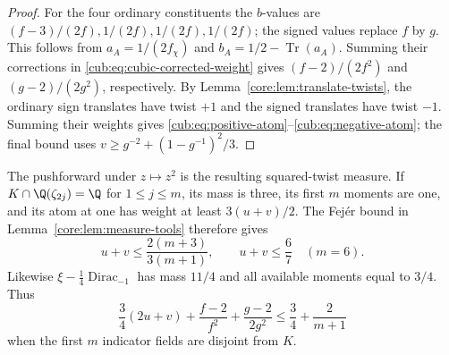 \begin{proof}
For the four ordinary constituents the $b$-values are
$(f-3)/(2f),1/(2f),1/(2f),1/(2f)$; the signed values replace $f$
by $g$. This follows from $a_A=1/(2f_\chi)$ and
$b_A=1/2-\operatorname{Tr}(a_A)$. Summing their corrections in
\eqref{cub:eq:cubic-corrected-weight} gives $(f-2)/(2f^2)$ and
$(g-2)/(2g^2)$, respectively. By
Lemma~\ref{core:lem:translate-twists}, the
ordinary sign translates have twist $+1$ and the signed translates
have twist $-1$. Summing their weights gives
\eqref{cub:eq:positive-atom}--\eqref{cub:eq:negative-atom}; the final
bound uses $v\ge g^{-2}+(1-g^{-1})^2/3$.
\end{proof}

The pushforward under $z\mapsto z^2$ is the resulting squared-twist
measure. If $K\cap\Q(\zeta_{2j})=\Q$ for $1\le j\le m$,
its mass is three, its first $m$ moments are one, and its atom at one
has weight at least $3(u+v)/2$. The Fej\'er bound in
Lemma~\ref{core:lem:measure-tools} therefore gives
\begin{equation}\label{cub:eq:cubic-corrected-six-sevenths}
 u+v\le\frac{2(m+3)}{3(m+1)},\qquad u+v\le\frac67\quad(m=6).
\end{equation}
Likewise $\xi-\tfrac14\operatorname{Dirac}_{-1}$ has mass $11/4$
and all available moments equal to $3/4$. Thus
\begin{equation}\label{cub:eq:unsquared-fejer}
 \frac34(2u+v)+\frac{f-2}{f^2}+\frac{g-2}{2g^2}
 \le\frac34+\frac2{m+1}
\end{equation}
when the first $m$ indicator fields are disjoint from $K$.

